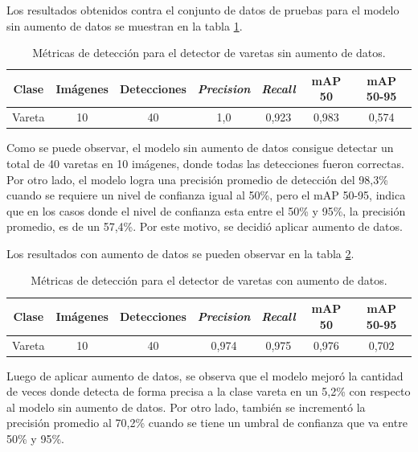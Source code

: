 Los resultados obtenidos contra el conjunto de datos de pruebas para el modelo sin aumento de datos se muestran en la tabla \ref{tab:resultadosVareta}.

\begin{table}[h]
	\centering
	\caption{Métricas de detección para el detector de varetas sin aumento de datos.}
	\begin{tabular}{c c c c c c c}    
		\toprule
		\textbf{Clase}&\textbf{Imágenes}&\textbf{Detecciones}&\textbf{\textit{Precision}} &\textbf{\textit{Recall}}&\textbf{mAP 50}&\textbf{mAP 50-95}\\
		\midrule
		Vareta & 10 & 40 & 1,0 & 0,923 & 0,983 & 0,574\\		
		\bottomrule
		\hline
	\end{tabular}
	\label{tab:resultadosVareta}
\end{table}

Como se puede observar, el modelo sin aumento de datos consigue detectar un total de 40 varetas en 10 imágenes, donde todas las detecciones fueron correctas. Por otro lado, el modelo logra una precisión promedio de detección del 98,3\% cuando se requiere un nivel de confianza igual al 50\%, pero el mAP 50-95, indica que en los casos donde el nivel de confianza esta entre el 50\% y 95\%, la precisión promedio, es de un 57,4\%. Por este motivo, se decidió aplicar aumento de datos.

Los resultados con aumento de datos se pueden observar en la tabla \ref{tab:resultadosVaretaConAug}.

\begin{table}[h]
	\centering
	\caption{Métricas de detección para el detector de varetas con aumento de datos.}
	\begin{tabular}{c c c c c c c}    
		\toprule
		\textbf{Clase}&\textbf{Imágenes}&\textbf{Detecciones}&\textbf{\textit{Precision}} &\textbf{\textit{Recall}}&\textbf{mAP 50}&\textbf{mAP 50-95}\\
		\midrule
		Vareta & 10 & 40 & 0,974 & 0,975 & 0,976 & 0,702\\		
		\bottomrule
		\hline
	\end{tabular}
	\label{tab:resultadosVaretaConAug}
\end{table}

Luego de aplicar aumento de datos, se observa que el modelo mejoró la cantidad de veces donde detecta de forma precisa a la clase vareta en un 5,2\% con respecto al modelo sin aumento de datos. Por otro lado, también se incrementó la precisión promedio al 70,2\% cuando se tiene un umbral de confianza que va entre 50\% y 95\%.

